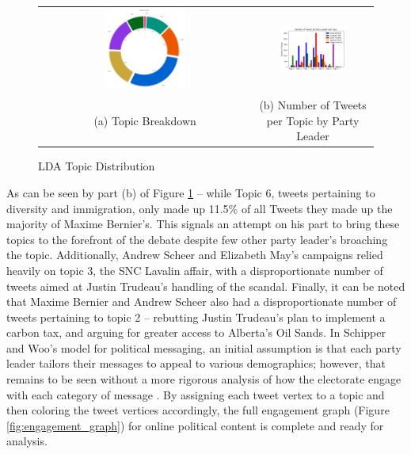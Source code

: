 \begin{figure}[h!]
  \centering
  \begin{tabular}{cc}
    \includegraphics[width=0.40\textwidth]{Figures/topic_distribution} &
    \includegraphics[width=0.60\textwidth]{Figures/grouped_bar_by_pl_topic} \\
  (a) Topic Breakdown & (b) Number of Tweets per Topic by Party Leader \\[6pt]
  \end{tabular}
  \caption[LDA Topic Distribution]{LDA Topic Distribution}
  \label{fig:topic_distribution}
\end{figure}

As can be seen by part (b) of Figure \ref{fig:topic_distribution} -- while Topic
6, tweets pertaining to diversity and immigration, only made up 11.5\% of all
Tweets they made up the majority of Maxime Bernier's. This signals an attempt on
his part to bring these topics to the forefront of the debate despite few other
party leader's broaching the topic. Additionally, Andrew Scheer and Elizabeth
May's campaigns relied heavily on topic 3, the SNC Lavalin affair, with a
disproportionate number of tweets aimed at Justin Trudeau's handling of the
scandal. Finally, it can be noted that Maxime Bernier and Andrew Scheer also had
a disproportionate number of tweets pertaining to topic 2 -- rebutting Justin
Trudeau's plan to implement a carbon tax, and arguing for greater access to
Alberta's Oil Sands. In Schipper and Woo's model for political messaging, an
initial assumption is that each party leader tailors their messages to appeal
to various demographics; however, that remains to be seen without a more
rigorous analysis of how the electorate engage with each category of message
\cite{schipper2018political}. By assigning each tweet vertex to a topic and then
coloring the tweet vertices accordingly, the full engagement graph (Figure
\ref{fig:engagement_graph}) for online political content is complete and ready
for analysis. 

